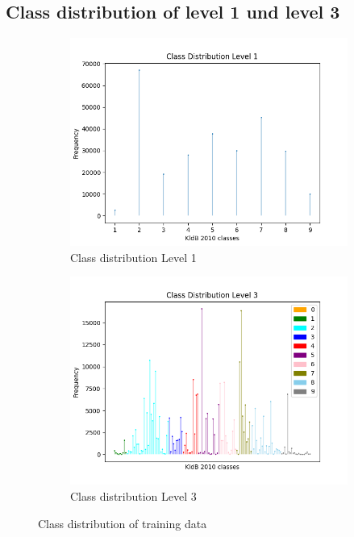\documentclass[12pt, a4paper, titlepage]{article}
\begin{document}
\subsection{Class distribution of level 1 und level 3}
\begin{figure}[hb!]
  \begin{subfigure}{.5\textwidth}
    \centering
    \includegraphics[width=.9\linewidth]{training_data_long_L1.png}
    \caption{\label{fig: F11} Class distribution Level 1}
  \end{subfigure}%
  \begin{subfigure}{.5\textwidth}
    \centering
    \includegraphics[width=.9\linewidth]{training_data_long_L3.png}
    \caption{\label{fig: F12} Class distribution Level 3}
  \end{subfigure}
  \caption{Class distribution of training data}
  \end{figure}
\end{document}
